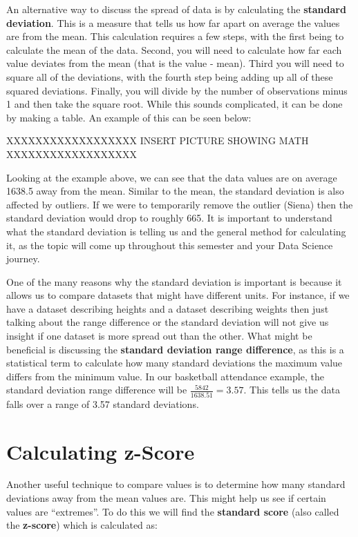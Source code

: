 \documentclass[
  letterpaper,
  DIV=11,
  numbers=noendperiod]{scrreprt}
\begin{document}
An alternative way to discuss the spread of data is by calculating the
\textbf{standard deviation}. This is a measure that tells us how far
apart on average the values are from the mean. This calculation requires
a few steps, with the first being to calculate the mean of the data.
Second, you will need to calculate how far each value deviates from the
mean (that is the value - mean). Third you will need to square all of
the deviations, with the fourth step being adding up all of these
squared deviations. Finally, you will divide by the number of
observations minus 1 and then take the square root. While this sounds
complicated, it can be done by making a table. An example of this can be
seen below:

XXXXXXXXXXXXXXXXXX INSERT PICTURE SHOWING MATH XXXXXXXXXXXXXXXXXX

Looking at the example above, we can see that the data values are on
average 1638.5 away from the mean. Similar to the mean, the standard
deviation is also affected by outliers. If we were to temporarily remove
the outlier (Siena) then the standard deviation would drop to roughly
665. It is important to understand what the standard deviation is
telling us and the general method for calculating it, as the topic will
come up throughout this semester and your Data Science journey.

One of the many reasons why the standard deviation is important is
because it allows us to compare datasets that might have different
units. For instance, if we have a dataset describing heights and a
dataset describing weights then just talking about the range difference
or the standard deviation will not give us insight if one dataset is
more spread out than the other. What might be beneficial is discussing
the \textbf{standard deviation range difference}, as this is a
statistical term to calculate how many standard deviations the maximum
value differs from the minimum value. In our basketball attendance
example, the standard deviation range difference will be
\(\displaystyle \frac{5842}{1638.51}=3.57\). This tells us the data
falls over a range of 3.57 standard deviations.

\section{Calculating z-Score}\label{calculating-z-score}

Another useful technique to compare values is to determine how many
standard deviations away from the mean values are. This might help us
see if certain values are ``extremes''. To do this we will find the
\textbf{standard score} (also called the \textbf{z-score}) which is
calculated as:
\end{document}
